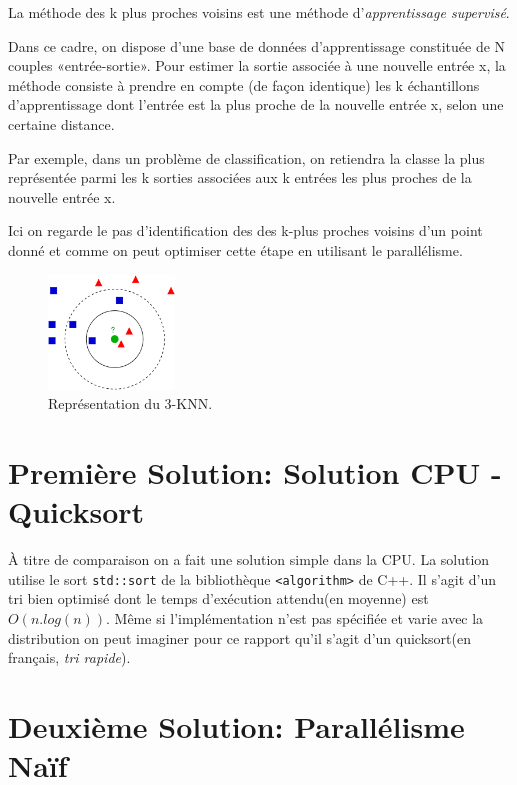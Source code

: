 \documentclass[12pt,oneside]{article}
\begin{document}
La méthode des k plus proches voisins est une méthode d’\textit{apprentissage supervisé}.

Dans ce cadre, on dispose d’une base de données d'apprentissage constituée de N couples «entrée-sortie». Pour estimer la sortie associée à une nouvelle entrée x, la méthode consiste à prendre en compte (de façon identique) les k échantillons d'apprentissage dont l’entrée est la plus proche de la nouvelle entrée x, selon une certaine distance.

Par exemple, dans un problème de classification, on retiendra la classe la plus représentée parmi les k sorties associées aux k entrées les plus proches de la nouvelle entrée x.

Ici on regarde le pas d'identification des des k-plus proches voisins d'un point donné et comme on peut optimiser cette étape en utilisant le parallélisme.

\begin{figure}[h]
\centering
\includegraphics[width=0.3\textwidth]{KNN.png}
\caption{\label{fig:3KNN} Représentation du 3-KNN.}
\end{figure}




\section{Première Solution: Solution CPU - Quicksort}

À titre de comparaison on a fait une solution simple dans la CPU. La solution utilise le sort \texttt{std::sort} de la bibliothèque \texttt{<algorithm>} de C++. Il s'agit d'un tri bien optimisé dont le temps d’exécution attendu(en moyenne) est $O(n.log(n))$. Même si l’implémentation n'est pas spécifiée et varie avec la distribution on peut imaginer pour ce rapport qu'il s'agit d'un quicksort(en français, \textit{tri rapide}).



\section{Deuxième Solution: Parallélisme Naïf}
\end{document}
